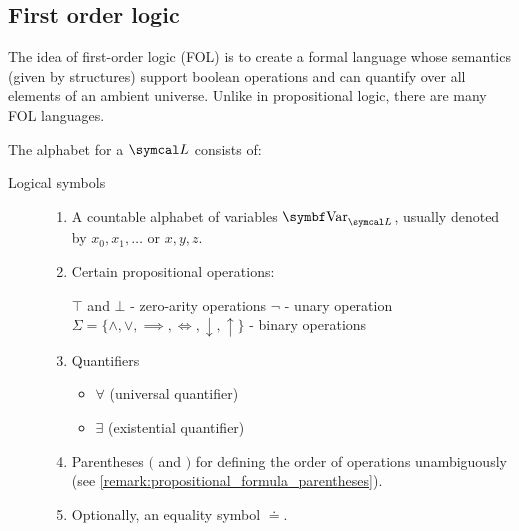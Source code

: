 \subsection{First order logic}\label{subsec:first_order_logic}

\begin{definition}\label{def:first_order_language}\cite[definition 2.1]{Nerode2012}
  The idea of first-order logic (FOL) is to create a formal language whose semantics (given by structures) support boolean operations and can quantify over all elements of an ambient universe. Unlike in propositional logic, there are many FOL languages.

  The alphabet for a  \( \Cal{L} \) consists of:
  \begin{description}
    \item[Logical symbols]
    \mbox{}
    \begin{enumerate}
      \item A countable alphabet of variables \( \Bold{Var}_{\Cal{L}} \), usually denoted by \( x_0, x_1, \ldots \) or \( x, y, z \).

      \item Certain propositional operations:
      \begin{description}
         \( \top \) and \( \bot \) - zero-arity operations
         \( \neg \) - unary operation
         \( \Sigma = \{ \land, \lor, \implies, \iff, \downarrow, \uparrow \} \) - binary operations
      \end{description}

      \item Quantifiers
      \begin{itemize}
        \item \( \forall \) (universal quantifier)
        \item \( \exists \) (existential quantifier)
      \end{itemize}

      \item Parentheses \( ( \) and \( ) \) for defining the order of operations unambiguously (see \cref{remark:propositional_formula_parentheses}).

      \item Optionally, an equality symbol \( \doteq \).
    \end{enumerate}


\end{description}
\end{definition}
